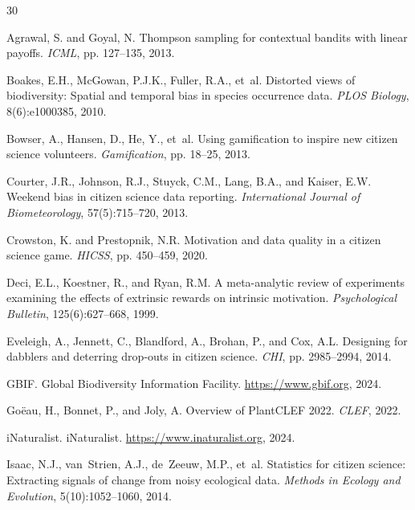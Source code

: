 \documentclass[11pt,a4paper]{article}
\begin{document}
\begin{thebibliography}{30}

Agrawal, S. and Goyal, N.
\newblock Thompson sampling for contextual bandits with linear payoffs.
\newblock \emph{ICML}, pp. 127--135, 2013.

Boakes, E.H., McGowan, P.J.K., Fuller, R.A., et~al.
\newblock Distorted views of biodiversity: Spatial and temporal bias in species
  occurrence data.
\newblock \emph{PLOS Biology}, 8(6):e1000385, 2010.

Bowser, A., Hansen, D., He, Y., et~al.
\newblock Using gamification to inspire new citizen science volunteers.
\newblock \emph{Gamification}, pp. 18--25, 2013.

Courter, J.R., Johnson, R.J., Stuyck, C.M., Lang, B.A., and Kaiser, E.W.
\newblock Weekend bias in citizen science data reporting.
\newblock \emph{International Journal of Biometeorology}, 57(5):715--720, 2013.

Crowston, K. and Prestopnik, N.R.
\newblock Motivation and data quality in a citizen science game.
\newblock \emph{HICSS}, pp. 450--459, 2020.

Deci, E.L., Koestner, R., and Ryan, R.M.
\newblock A meta-analytic review of experiments examining the effects of
  extrinsic rewards on intrinsic motivation.
\newblock \emph{Psychological Bulletin}, 125(6):627--668, 1999.

Eveleigh, A., Jennett, C., Blandford, A., Brohan, P., and Cox, A.L.
\newblock Designing for dabblers and deterring drop-outs in citizen science.
\newblock \emph{CHI}, pp. 2985--2994, 2014.

GBIF.
\newblock Global Biodiversity Information Facility.
\newblock \url{https://www.gbif.org}, 2024.

Go{\"e}au, H., Bonnet, P., and Joly, A.
\newblock Overview of PlantCLEF 2022.
\newblock \emph{CLEF}, 2022.

iNaturalist.
\newblock iNaturalist.
\newblock \url{https://www.inaturalist.org}, 2024.

Isaac, N.J., van~Strien, A.J., de~Zeeuw, M.P., et~al.
\newblock Statistics for citizen science: Extracting signals of change from
  noisy ecological data.
\newblock \emph{Methods in Ecology and Evolution}, 5(10):1052--1060, 2014.


\end{thebibliography}
\end{document}
